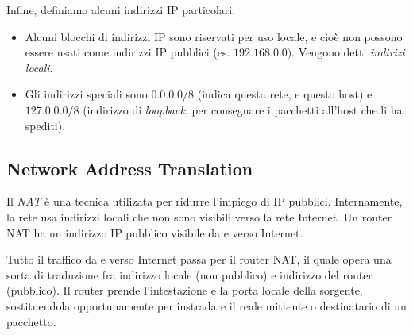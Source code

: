         \vspace{3mm}
        
        Infine, definiamo alcuni indirizzi IP particolari.
    
        \begin{itemize}
            \item
                Alcuni blocchi di indirizzi IP sono riservati per uso locale, e cioè non possono essere usati come indirizzi IP pubblici (es. $192.168.0.0)$. Vengono detti \textit{indirizi locali}.
                
            \item
                Gli indirizzi speciali sono $0.0.0.0/8$ (indica questa rete, e questo host) e $127.0.0.0/8$ (indirizzo di \textit{loopback}, per consegnare i pacchetti all'host che li ha spediti).
        \end{itemize}
        
    \subsection{Network Address Translation}
    
        Il \textit{NAT} è una tecnica utilizata per ridurre l'impiego di IP pubblici. Internamente, la rete usa indirizzi locali che non sono visibili verso la rete Internet. Un router NAT ha un indirizzo IP pubblico visibile da e verso Internet. 
        
        Tutto il traffico da e verso Internet passa per il router NAT, il quale opera una sorta di traduzione fra indirizzo locale (non pubblico) e indirizzo del router (pubblico). Il router prende l'intestazione e la porta locale della sorgente, sostituendola opportunamente per instradare il reale mittente o destinatario di un pacchetto.
        
        